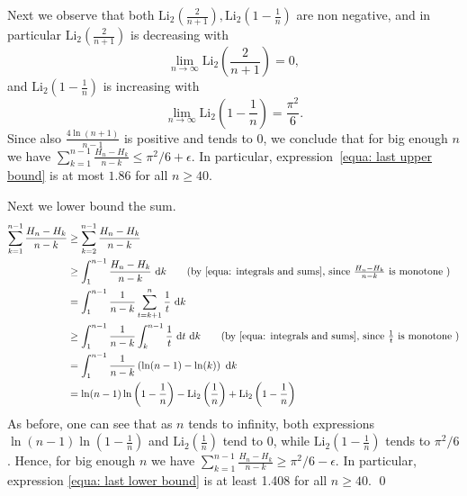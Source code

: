 \documentclass[11pt]{llncs}
\def\d{~\textrm{d}}
\def\Li{\textrm{Li}}
\begin{document}
Next we observe that both $\Li_2\left(\frac2{n+1}\right), \Li_2\left(1-\frac1{n}\right)$ are non negative, and in particular $\Li_2\left(\frac2{n+1}\right)$ is decreasing with 
$$
\lim_{n\rightarrow \infty}\Li_2\left(\frac{2}{n+1}\right) = 0,
$$
and $\Li_2\left(1-\frac1{n}\right)$ is increasing with 
$$\lim_{n\rightarrow \infty}\Li_2\left(1-\frac1n\right) = \frac{\pi^2}6.$$
Since also $\frac{4  \ln(n+1)}{n-1}$ is positive and tends to 0, we conclude that for big enough $n$ we have $\sum_{k=1}^{n-1}\frac{H_n-H_k}{n-k} \leq \pi^2/6 + \epsilon$. In particular, expression~\eqref{equa: last upper bound} is at most $1.86$ for all $n\geq 40$.

Next we lower bound the sum. 
\begin{align}
\sum_{k=1}^{n-1}\frac{H_n-H_k}{n-k}
&\geq 
\sum_{k=2}^{n-1}\frac{H_n-H_k}{n-k} \notag \\
&\geq 
\int_{1}^{n-1}\frac{H_n-H_k}{n-k} \d k  \tag{by \eqref{equa: integrals and sums}, since $\frac{H_n-H_k}{n-k}$ is monotone }\\
&= 
\int_{1}^{n-1}\frac1{n-k}\sum_{t=k+1}^n \frac1t \d k  \notag  \\
&\geq 
\int_{1}^{n-1}\frac1{n-k}\int_{k}^{n-1} \frac1t \d t\d k \tag{by \eqref{equa: integrals and sums}, since $\frac{1}{t}$ is monotone } \\
&= 
\int_{1}^{n-1}\frac1{n-k} \left( \ln (n-1) - \ln (k) \right) \d k \notag  \\
&= 
\ln(n-1)\ln \left(1-\frac{1}{n}\right) - \Li_2\left(\frac1{n}\right) + \Li_2\left(1-\frac1{n}\right) 
\label{equa: last lower bound}
\end{align}
As before, one can see that as $n$ tends to infinity, both expressions $\ln(n-1)\ln \left(1-\frac{1}{n}\right)$ and $\Li_2\left(\frac1{n}\right)$ tend to 0, while $\Li_2\left(1-\frac1{n}\right) $ tends to $\pi^2/6$. Hence, for big enough $n$ we have 
$\sum_{k=1}^{n-1}\frac{H_n-H_k}{n-k} \geq \pi^2/6 - \epsilon$. In particular, expression \eqref{equa: last lower bound} is at least 1.408 for all $n \geq 40$. 
\qed
\end{document}

